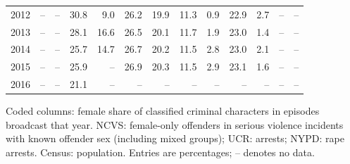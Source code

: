 \begin{center}
\begin{tabular}{@{}rrrrrrrrrrrrr@{}}
2012 & -- & -- & 30.8 & 9.0 & 26.2 & 19.9 & 11.3 & 0.9 & 22.9 & 2.7 & -- & -- \\
2013 & -- & -- & 28.1 & 16.6 & 26.5 & 20.1 & 11.7 & 1.9 & 23.0 & 1.4 & -- & -- \\
2014 & -- & -- & 25.7 & 14.7 & 26.7 & 20.2 & 11.5 & 2.8 & 23.0 & 2.1 & -- & -- \\
2015 & -- & -- & 25.9 & -- & 26.9 & 20.3 & 11.5 & 2.9 & 23.1 & 1.6 & -- & -- \\
2016 & -- & -- & 21.1 & -- & -- & -- & -- & -- & -- & -- & -- & -- \\
\bottomrule
\end{tabular}
\par\smallskip
\parbox{\linewidth}{\footnotesize Coded columns: female share of classified criminal characters in episodes broadcast that year. NCVS: female-only offenders in serious violence incidents with known offender sex (including mixed groups); UCR: arrests; NYPD: rape arrests. Census: population.  Entries are percentages; -- denotes no data.}
\end{center}
